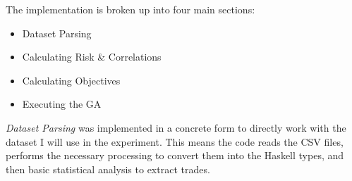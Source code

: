 \documentclass[11pt]{article}
\begin{document}
    The implementation is broken up into four main sections:

    \begin{itemize}
        \item{Dataset Parsing}
        \item{Calculating Risk \& Correlations}
        \item{Calculating Objectives}
        \item{Executing the GA}
    \end{itemize}

    \textit{Dataset Parsing} was implemented in a concrete form to directly work with the
    dataset I will use in the experiment. This means the code reads the CSV files,
    performs the necessary processing to convert them into the Haskell types, and then
    basic statistical analysis to extract trades.

\pagebreak


\end{document}
